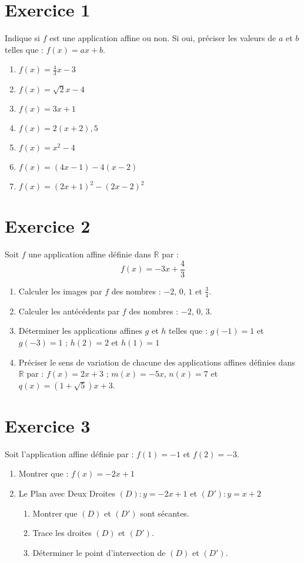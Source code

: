 \documentclass[12pt,a4paper]{article}
\begin{document}
\begin{multicols}{2}
\setlength{\columnseprule}{0.1mm} %
\section*{Exercice 1}
Indique si $f$ est une application affine ou non. Si oui, préciser les valeurs de $a$ et $b$ telles que : $f(x) = ax + b$.
\begin{enumerate}
    \item $f(x) = \frac{4}{3}x - 3$
    \item $f(x) = \sqrt{2}x - 4$
    \item $f(x) = 3x + 1$
    \item $f(x) = 2(x + 2), 5$
    \item $f(x) = x^2 - 4$
    \item $f(x) = (4x - 1) - 4(x - 2)$
    \item $f(x) = (2x + 1)^2 - (2x - 2)^2$
\end{enumerate}

\section*{Exercice 2}
Soit $f$ une application affine définie dans $\mathbb{R}$ par : 
$$ f(x) = -3x + \frac{4}{3} $$
\begin{enumerate}
    \item Calculer les images par $f$ des nombres : $-2$, $0$, $1$ et $\frac{3}{4}$.
    \item Calculer les antécédents par $f$ des nombres : $-2$, $0$, $3$.
    \item Déterminer les applications affines $g$ et $h$ telles que : $g(-1) = 1$ et $g(-3) = 1$ ; $h(2) = 2$ et $h(1) = 1$
    \item Préciser le sens de variation de chacune des applications affines définies dans $\mathbb{R}$ par : $f(x) = 2x + 3$ ; $m(x) = -5x$, $n(x) = 7$ et $q(x) = (1 + \sqrt{5})x + 3$.
\end{enumerate}

\section*{Exercice 3}
Soit l’application affine définie par : $f(1) = -1$ et $f(2) = -3$.
\begin{enumerate}
    \item Montrer que : $f(x) = -2x + 1$
    \item Le Plan avec Deux Droites $(D) : y = -2x + 1$ et $(D') : y = x + 2$
    \begin{enumerate}
        \item Montrer que $(D)$ et $(D')$ sont sécantes.
        \item Trace les droites $(D)$ et $(D')$.
        \item Déterminer le point d'intersection de $(D)$ et $(D')$.
    \end{enumerate}
\end{enumerate}


\end{multicols}
\end{document}
